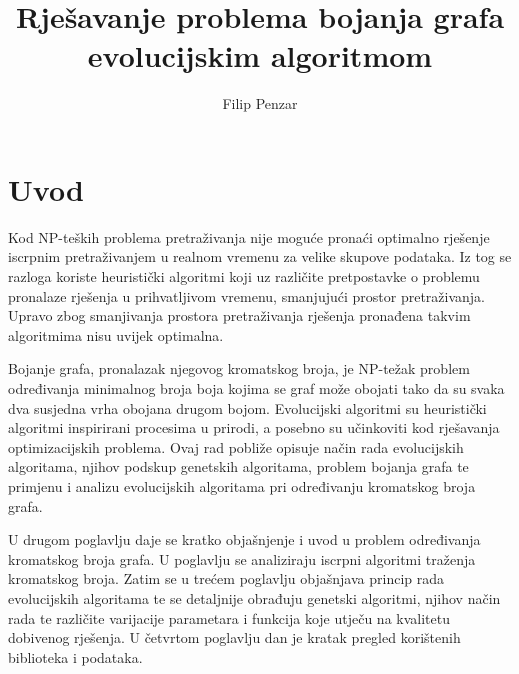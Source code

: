 \documentclass[times, utf8, zavrsni, numeric]{fer}
\begin{document}

\title{Rješavanje problema bojanja grafa evolucijskim algoritmom}

\author{Filip Penzar}

\maketitle



\tableofcontents

\chapter{Uvod}
Kod NP-teških problema pretraživanja nije moguće pronaći optimalno rješenje iscrpnim pretraživanjem u realnom vremenu za velike skupove podataka. Iz tog se razloga koriste heuristički algoritmi koji uz različite pretpostavke o problemu pronalaze rješenja u prihvatljivom vremenu, smanjujući prostor pretraživanja. Upravo zbog smanjivanja prostora pretraživanja rješenja pronađena takvim algoritmima nisu uvijek optimalna.

Bojanje grafa, pronalazak njegovog kromatskog broja, je NP-težak problem određivanja minimalnog broja boja kojima se graf može obojati tako da su svaka dva susjedna vrha obojana drugom bojom. Evolucijski algoritmi su heuristički algoritmi inspirirani procesima u prirodi, a posebno su učinkoviti kod rješavanja optimizacijskih problema. Ovaj rad pobliže opisuje način rada evolucijskih algoritama, njihov podskup genetskih algoritama, problem bojanja grafa te primjenu i analizu evolucijskih algoritama pri određivanju kromatskog broja grafa.

U drugom poglavlju daje se kratko objašnjenje i uvod u problem određivanja kromatskog broja grafa. U poglavlju se analiziraju iscrpni algoritmi traženja kromatskog broja. Zatim se u trećem poglavlju objašnjava princip rada evolucijskih algoritama te se detaljnije obrađuju genetski algoritmi, njihov način rada te različite varijacije parametara i funkcija koje utječu na kvalitetu dobivenog rješenja. U četvrtom poglavlju dan je kratak pregled korištenih biblioteka i podataka. 
\end{document}
